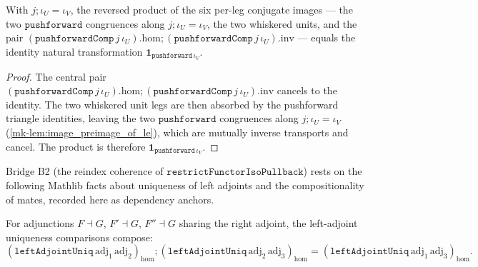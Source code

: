 \begin{lemma}
  \label{mk-lem:pushforwardcomp_reindex_telescope}
  \lean{}
  \lean{}
  With \(j \mathbin{;} \iota_U = \iota_V\), the reversed product of the six per-leg conjugate images
  --- the two \(\mathtt{pushforward}\) congruences along \(j \mathbin{;} \iota_U = \iota_V\), the two
  whiskered units, and the pair
  \((\mathtt{pushforwardComp}\,j\,\iota_U).\mathrm{hom} \mathbin{;}
  (\mathtt{pushforwardComp}\,j\,\iota_U).\mathrm{inv}\) --- equals the identity natural
  transformation \(\mathbf{1}_{\mathtt{pushforward}\,\iota_V}\).
\end{lemma}
\begin{proof}
  The central pair \((\mathtt{pushforwardComp}\,j\,\iota_U).\mathrm{hom} \mathbin{;}
  (\mathtt{pushforwardComp}\,j\,\iota_U).\mathrm{inv}\) cancels to the identity. The two whiskered
  unit legs are then absorbed by the pushforward triangle identities, leaving the two
  \(\mathtt{pushforward}\) congruences along \(j \mathbin{;} \iota_U = \iota_V\)
  (\ref{mk-lem:image_preimage_of_le}), which are mutually inverse transports and cancel. The product
  is therefore \(\mathbf{1}_{\mathtt{pushforward}\,\iota_V}\).
\end{proof}
Bridge B2 (the reindex coherence of \(\mathtt{restrictFunctorIsoPullback}\)) rests on the
following Mathlib facts about uniqueness of left adjoints and the compositionality of
mates, recorded here as dependency anchors.

\begin{lemma}
  \label{mk-lem:adjunction_leftadjointuniq_trans}
  \mathlibok

  For adjunctions \(F \dashv G\), \(F' \dashv G\), \(F'' \dashv G\) sharing the right adjoint, the
  left-adjoint uniqueness comparisons compose:
  \[
    (\mathtt{leftAdjointUniq}\,\mathrm{adj}_1\,\mathrm{adj}_2)_{\mathrm{hom}}
      \mathbin{;} (\mathtt{leftAdjointUniq}\,\mathrm{adj}_2\,\mathrm{adj}_3)_{\mathrm{hom}}
      = (\mathtt{leftAdjointUniq}\,\mathrm{adj}_1\,\mathrm{adj}_3)_{\mathrm{hom}}.
  \]
\end{lemma}

